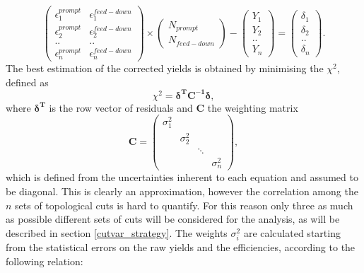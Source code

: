 \documentclass[b5paper,10pt,twoside,oldstyle,classica]{toptesi}
\begin{document}
\begin{equation}
\renewcommand\arraystretch{1.3} {
\left(
\begin{array}{cc}
\epsilon^{prompt}_1 & \epsilon^{feed-down}_1\\
\epsilon^{prompt}_2 & \epsilon^{feed-down}_2\\
.. & ..\\
\epsilon^{prompt}_n & \epsilon^{feed-down}_n
\end{array}
 \right)} 
 \times
 \left(
\begin{array}{c}
 N_{prompt}\\
 N_{feed-down}
\end{array}
 \right) 
 -
  \left(
\begin{array}{c}
Y_1\\
Y_2\\
..\\
Y_n
\end{array}
 \right)
 = 
\left(
\begin{array}{c}
\delta_1\\
\delta_2\\
..\\
\delta_n
\end{array}
 \right)
 .
\end{equation} 
The best estimation of the corrected yields is obtained by minimising the $\chi^2$, defined as 
\begin{equation}
 \chi^2 = \pmb{\delta^T}\pmb{C^{-1}}\pmb{\delta},
\end{equation}
where $\pmb{\delta^T}$ is the row vector of residuals and $\pmb{C}$ the weighting matrix
\begin{equation}
\pmb{C} = 
\left(
\begin{array}{cccc}
\sigma^2_1 & & &\\
 & \sigma^2_2 & &\\
 & & \ddots &\\
 &  &  & \sigma^2_n
\end{array}
 \right)
 ,
 \label{weightmatrix}
\end{equation}
which is defined from the uncertainties inherent to each equation and assumed to be diagonal. This is clearly an approximation, however the correlation among the $n$ sets of topological cuts is hard to quantify. For this reason only three as much as possible different sets of cuts will be considered for the analysis, as will be described in section \ref{cutvar_strategy}. The weights $\sigma_i^2$ are calculated starting from the statistical errors on the raw yields and the efficiencies, according to the following relation:
\end{document}
